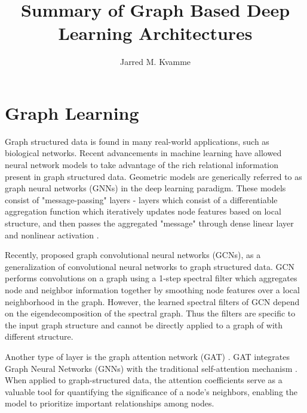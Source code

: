 \documentclass[a4paper,12pt]{article}
\begin{document}
	\begin{titlepage}
		\title{Summary of Graph Based Deep Learning Architectures}
		\author{Jarred M. Kvamme}
		\maketitle
	\end{titlepage}
	
	\newpage
	\tableofcontents{}
	\listoffigures
	\newpage
	\clearpage
	\section{Graph Learning}
	Graph structured data is found in many real-world applications, such as biological networks. Recent advancements in machine learning have allowed neural network models to take advantage of the rich relational information present in graph structured data. Geometric models are generically referred to as graph neural networks (GNNs) in the deep learning paradigm. These models consist of "message-passing" layers - layers which consist of a differentiable aggregation function which iteratively updates node features based on local structure, and then passes the aggregated "message" through dense linear layer and nonlinear activation \cite{scarselli2008graph,gori2005new}. 
	
 	Recently, \cite{kipf2016semi} proposed graph convolutional neural networks (GCNs), as a generalization of convolutional neural networks to graph structured data. GCN performs convolutions on a graph using a 1-step spectral filter which aggregates node and neighbor information together by smoothing node features over a local neighborhood in the graph. However, the learned spectral filters of GCN depend on the eigendecomposition of the spectral graph. Thus the filters are specific to the input graph structure and cannot be directly applied to a graph of with different structure. 
 	
 	Another type of layer is the graph attention network (GAT) \cite{velivckovic2017graph}. GAT integrates Graph Neural Networks (GNNs) with the traditional self-attention mechanism \cite{bahdanau2014neural}. When applied to graph-structured data, the attention coefficients serve as a valuable tool for quantifying the significance of a node's neighbors, enabling the model to prioritize important relationships among nodes.
\end{document}
